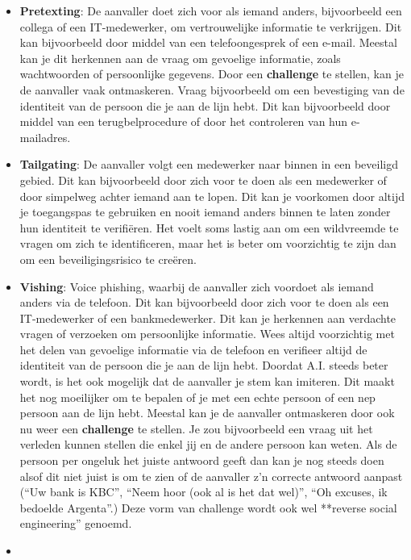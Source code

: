 \documentclass[
  10pt,
  dutch,
  paper=a4,
  ,captions=tableheading
]{scrbook}
\providecommand{\tightlist}{%
  \setlength{\itemsep}{0pt}\setlength{\parskip}{0pt}}
\begin{document}
\begin{itemize}
\tightlist
\item
  \textbf{Pretexting}: De aanvaller doet zich voor als iemand anders,
  bijvoorbeeld een collega of een IT-medewerker, om vertrouwelijke
  informatie te verkrijgen. Dit kan bijvoorbeeld door middel van een
  telefoongesprek of een e-mail. Meestal kan je dit herkennen aan de
  vraag om gevoelige informatie, zoals wachtwoorden of persoonlijke
  gegevens. Door een \textbf{challenge} te stellen, kan je de aanvaller
  vaak ontmaskeren. Vraag bijvoorbeeld om een bevestiging van de
  identiteit van de persoon die je aan de lijn hebt. Dit kan
  bijvoorbeeld door middel van een terugbelprocedure of door het
  controleren van hun e-mailadres.
\item
  \textbf{Tailgating}: De aanvaller volgt een medewerker naar binnen in
  een beveiligd gebied. Dit kan bijvoorbeeld door zich voor te doen als
  een medewerker of door simpelweg achter iemand aan te lopen. Dit kan
  je voorkomen door altijd je toegangspas te gebruiken en nooit iemand
  anders binnen te laten zonder hun identiteit te verifiëren. Het voelt
  soms lastig aan om een wildvreemde te vragen om zich te identificeren,
  maar het is beter om voorzichtig te zijn dan om een beveiligingsrisico
  te creëren.
\item
  \textbf{Vishing}: Voice phishing, waarbij de aanvaller zich voordoet
  als iemand anders via de telefoon. Dit kan bijvoorbeeld door zich voor
  te doen als een IT-medewerker of een bankmedewerker. Dit kan je
  herkennen aan verdachte vragen of verzoeken om persoonlijke
  informatie. Wees altijd voorzichtig met het delen van gevoelige
  informatie via de telefoon en verifieer altijd de identiteit van de
  persoon die je aan de lijn hebt. Doordat A.I. steeds beter wordt, is
  het ook mogelijk dat de aanvaller je stem kan imiteren. Dit maakt het
  nog moeilijker om te bepalen of je met een echte persoon of een nep
  persoon aan de lijn hebt. Meestal kan je de aanvaller ontmaskeren door
  ook nu weer een \textbf{challenge} te stellen. Je zou bijvoorbeeld een
  vraag uit het verleden kunnen stellen die enkel jij en de andere
  persoon kan weten. Als de persoon per ongeluk het juiste antwoord
  geeft dan kan je nog steeds doen alsof dit niet juist is om te zien of
  de aanvaller z'n correcte antwoord aanpast (``Uw bank is KBC'', ``Neem
  hoor (ook al is het dat wel)'', ``Oh excuses, ik bedoelde Argenta''.)
  Deze vorm van challenge wordt ook wel **reverse social engineering''
  genoemd.
\item

\end{itemize}
\end{document}
